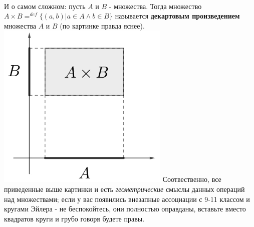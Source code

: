 \documentclass[10pt, a4paper,twocolumn]{article}
\begin{document}
\\И о самом сложном: пусть $A$ и $B$ - множества. Тогда множество $A \times B =^{def} \{ (a, b) | a \in A \wedge b \in B \}$ называется \textbf{декартовым произведением} множества $A$ и $B$ (по картинке правда яснее).
\\ \includegraphics{decart}
Соотвественно, все приведенные выше картинки и есть \textsl{геометрические} смыслы данных операций над множествами; если у вас появились внезапные ассоциации с 9-11 классом и кругами Эйлера - не беспокойтесь, они полностью оправданы, вставьте вместо квадратов круги и грубо говоря будете правы.
\end{document}
